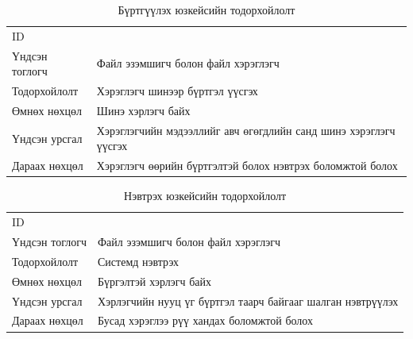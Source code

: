 \begin{table}
    \label{tab:treatments}
    \footnotesize
    \centering
    \begin{tabularx}{\textwidth}{|>{\hsize=0.3\hsize}X|>{\hsize=0.7\hsize}X|}
        \hline
        \multicolumn{2}{|c|}{Бүртгүүлэх} \\
        \hline
        ID & 1 \\
        \hline
        Үндсэн тоглогч & Файл эзэмшигч болон файл хэрэглэгч\\
        \hline
        Тодорхойлолт & Хэрэглэгч шинээр бүртгэл үүсгэх\\
        \hline
        Өмнөх нөхцөл & Шинэ хэрлэгч байх\\
        \hline
        Үндсэн урсгал & Хэрэглэгчийн мэдээллийг авч өгөгдлийн санд шинэ хэрэглэгч үүсгэх\\
        \hline
        Дараах нөхцөл & Хэрэглэгч өөрийн бүртгэлтэй болох нэвтрэх боломжтой болох\\
        \hline
    \end{tabularx}
    \caption{Бүртгүүлэх юзкейсийн тодорхойлолт}
\end{table}

\begin{table}
    \label{tab:treatments}
    \footnotesize
    \centering
    \begin{tabularx}{\textwidth}{|>{\hsize=0.3\hsize}X|>{\hsize=0.7\hsize}X|}
        \hline
        \multicolumn{2}{|c|}{Нэвтрэх} \\
        \hline
        ID & 2\\
        \hline
        Үндсэн тоглогч & Файл эзэмшигч болон файл хэрэглэгч\\
        \hline
        Тодорхойлолт & Системд нэвтрэх\\
        \hline
        Өмнөх нөхцөл & Бүргэлтэй хэрлэгч байх\\
        \hline
        Үндсэн урсгал & Хэрлэгчийн нууц үг бүртгэл таарч байгааг шалган нэвтрүүлэх\\
        \hline
        Дараах нөхцөл & Бусад хэрэглээ рүү хандах боломжтой болох\\
        \hline
    \end{tabularx}
    \caption{Нэвтрэх юзкейсийн тодорхойлолт}
\end{table}

